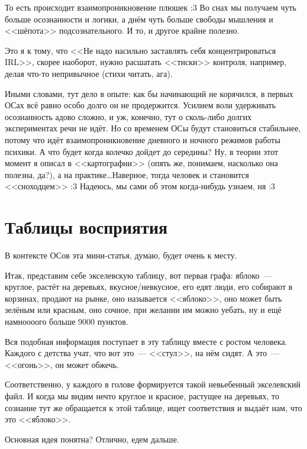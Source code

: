 \documentclass[a4paper,14pt,oneside]{memoir}
\begin{document}
То есть происходит взаимопроникновение плюшек :3 Во снах мы получаем чуть больше осознанности и логики, а днём чуть больше свободы мышления и <<шёпота>> подсознательного. И то, и другое крайне полезно.
 
Это я к тому, что <<Не надо насильно заставлять себя концентрироваться IRL>>, скорее наоборот, нужно расшатать <<тиски>> контроля, например, делая что-то непривычное (стихи читать, ага).
 
Иными словами, тут дело в опыте: как бы начинающий не корячился, в первых ОСах всё равно особо долго он не продержится. Усилием воли удерживать осознанность адово сложно, и уж, конечно, тут о сколь-либо долгих экспериментах речи не идёт. Но со временем ОСы будут становиться стабильнее, потому что идёт взаимопроникновение дневного и ночного режимов работы психики. А что будет когда колечко дойдет до середины? Ну, в теории этот момент я описал в <<картографии>> (опять же, понимаем, насколько она полезна, да?), а на практике\ldots Наверное, тогда человек и становится <<сноходцем>> :3 Надеюсь, мы сами об этом когда-нибудь узнаем, ня :3 



\section{Таблицы восприятия}
В контексте ОСов эта мини-статья, думаю, будет очень к месту. 

Итак, представим себе экселевскую таблицу, вот первая графа: яблоко~--- круглое, растёт на деревьях, вкусное/невкусное, его едят люди, его собирают в корзинах, продают на рынке, оно называется <<яблоко>>, оно может быть зелёным или красным, оно сочное, при желании им можно уебать, ну и ещё намноооого больше 9000 пунктов. 

Вся подобная информация поступает в эту таблицу вместе с ростом человека. Каждого с детства учат, что вот это~--- <<стул>>, на нём сидят. А это~--- <<огонь>>, он может обжечь. 

Соответственно, у каждого в голове формируется такой невьебенный экселевский файл. И когда мы видим нечто круглое и красное, растущее на деревьях, то сознание тут же обращается к этой таблице, ищет соответствия и выдаёт нам, что это <<яблоко>>. 

Основная идея понятна? Отлично, едем дальше. 
\end{document}
